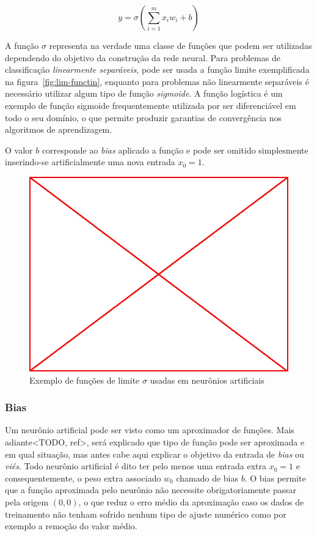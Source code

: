 $$y=\sigma(\sum_{i=1}^{m}x_i w_i + b)$$

A função $\sigma$ representa na verdade uma classe de funções que podem ser
utilizadas dependendo do objetivo da construção da rede neural. Para problemas
de classificação \emph{linearmente separáveis}, pode ser usada a função limite
exemplificada na figura~\ref{fig:lim-functin}, enquanto para problemas não
linearmente separáveis é necessário utilizar algum tipo de função
\emph{sigmoide}. A função logística é um exemplo de função sigmoide
frequentemente utilizada por ser diferenciável em todo o seu domínio, o que
permite produzir garantias de convergência nos algoritmos de aprendizagem.

O valor $b$ corresponde ao \emph{bias} aplicado a função e pode ser omitido
simplesmente inserindo-se artificialmente uma nova entrada $x_0 = 1$.

\begin{figure}
\label{fig:lim-fun}
  \caption{Exemplo de funções de limite $\sigma$ usadas em neurônios artificiais}
  \begin{center}
    \includegraphics[scale=0.5]{placeholder}
  \end{center}
\end{figure}

\subsubsection{Bias}

Um neurônio artificial pode ser visto como um aproximador de funções. Mais
adiante<TODO, ref>, será explicado que tipo de função pode ser aproximada e em
qual situação, mas antes cabe aqui explicar o objetivo da entrada de
\emph{bias} ou \emph{viés}. Todo neurônio artificial é dito ter pelo menos uma
entrada extra $x_0 = 1$ e consequentemente, o peso extra associado $w_0$
chamado de bias $b$. O bias permite que a função aproximada pelo neurônio não
necessite obrigatoriamente passar pela origem $(0,0)$, o que reduz o erro médio
da aproximação caso os dados de treinamento não tenham sofrido nenhum tipo de
ajuste numérico como por exemplo a remoção do valor médio.

